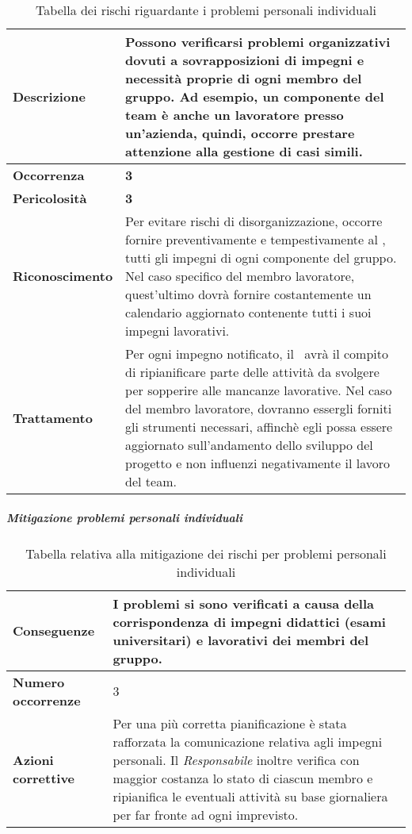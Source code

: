 \begin{table}[H]
	\begin{center}
		\begin{tabular}{|l | p{11cm}|}
			\hline
			\textbf{Descrizione}	& Possono verificarsi problemi organizzativi dovuti a sovrapposizioni di impegni e necessità proprie di ogni membro del gruppo. Ad esempio, un componente del team è anche un lavoratore presso un'azienda, quindi, occorre prestare attenzione alla gestione di casi simili. \\
			\hline
			\textbf{Occorrenza}	&	\textbf{3}	\\
			\hline
			\textbf{Pericolosità}	&	\textbf{3}	\\
			\hline
			\textbf{Riconoscimento}	&	Per evitare rischi di disorganizzazione, occorre fornire preventivamente e tempestivamente al \textit{\RdP}, tutti gli impegni di ogni componente del gruppo. Nel caso specifico del membro lavoratore, quest'ultimo dovrà fornire costantemente un calendario aggiornato contenente tutti i suoi impegni lavorativi.	\\
			\hline
			\textbf{Trattamento}	&	Per ogni impegno notificato, il \textit{\RdP}\ avrà il compito di ripianificare parte delle attività da svolgere per sopperire alle mancanze lavorative. Nel caso del membro lavoratore, dovranno essergli forniti gli strumenti necessari, affinchè egli possa essere aggiornato sull'andamento dello sviluppo del progetto e non influenzi negativamente il lavoro del team.	\\
			\hline
		\end{tabular}
		\caption{Tabella dei rischi riguardante i problemi personali individuali}
	\end{center}
\end{table}

\subparagraph{Mitigazione problemi personali individuali}

\begin{table}[H]
	\begin{center}
		\begin{tabular}{|l | p{11cm}|}
			\hline
			\textbf{Conseguenze}	& I problemi si sono verificati a causa della corrispondenza di impegni didattici
			(esami universitari) e lavorativi dei membri del gruppo. \\
			\hline
			\textbf{Numero occorrenze} & 3 \\
			\hline
			\textbf{Azioni correttive}	&	Per una più corretta pianificazione è stata rafforzata la comunicazione
			relativa agli impegni personali. Il \textit{Responsabile} inoltre verifica con maggior costanza lo
			stato di ciascun membro e ripianifica le eventuali attività su base giornaliera per far fronte
			ad ogni imprevisto.	\\
			\hline
		\end{tabular}
		\caption{Tabella relativa alla mitigazione dei rischi per problemi personali individuali}
	\end{center}
\end{table}

